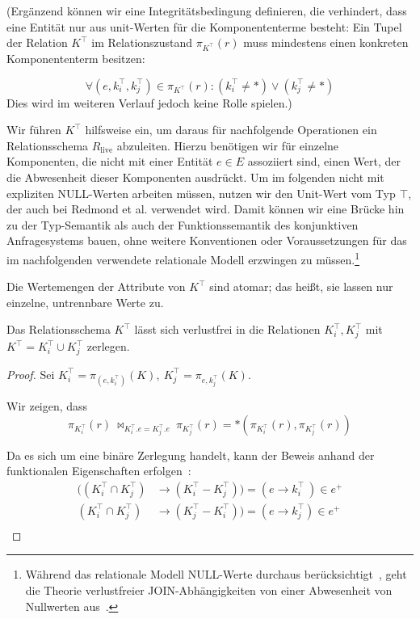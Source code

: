 \noindent
(Ergänzend können wir eine Integritätsbedingung definieren, die verhindert, dass eine Entität nur aus unit-Werten für die Komponententerme besteht: Ein Tupel der Relation $K^\top$ im Relationszustand $\pi_{K^\top}(r)$ muss mindestens einen konkreten Komponententerm besitzen:

\[
  \forall (e, k^\top_i, k^\top_j) \in \pi_{K^\top}(r): (k^\top_i \neq *) \lor (k^\top_j \neq *)
\]
\noindent
Dies wird im weiteren Verlauf jedoch keine Rolle spielen.)

\bigskip
\noindent
Wir führen $K^\top$ hilfsweise ein, um daraus für nachfolgende Operationen ein Relationsschema $R_\text{live}$ abzuleiten.
Hierzu benötigen wir für einzelne Komponenten, die nicht mit einer Entität $e \in E$ assoziiert sind, einen Wert, der die Abwesenheit dieser Komponenten ausdrückt.
Um im folgenden nicht mit expliziten NULL-Werten arbeiten müssen, nutzen wir den Unit-Wert vom Typ $\top$, der auch bei Redmond et al. verwendet wird.
Damit können wir eine Brücke hin zu der Typ-Semantik als auch der Funktionssemantik des konjunktiven Anfragesystems bauen, ohne weitere Konventionen oder Voraussetzungen für das im nachfolgenden verwendete relationale Modell erzwingen zu müssen.\footnote{Während das relationale Modell NULL-Werte durchaus berücksichtigt~\cite[136]{EN11}, geht die Theorie verlustfreier JOIN-Abhängigkeiten von einer Abwesenheit von Nullwerten aus~\cite[S. 347--348]{EN11}.
}

\bigskip
\begin{axiom}\label{ax:nur_atomar}
Die Wertemengen der Attribute von $K^\top$ sind atomar; das heißt, sie lassen nur einzelne, untrennbare Werte zu.
\end{axiom}

\bigskip
\begin{theorem}\label{th:K_ist_verlustfrei}
    Das Relationsschema $K^\top$ lässt sich verlustfrei in die Relationen $K^\top_i, K^\top_j$ mit $K^\top = K^\top_i \cup K^\top_j$ zerlegen.
\end{theorem}

\medskip
\begin{proof}
    Sei $K^{\top}_i = \pi_{(e, k^{\top}_i)}(K),\ K^{\top}_j = \pi_{e, k^{\top}_j}(K)$.

    \noindent
    Wir zeigen, dass
    \[
        \pi_{K^{\top}_i}(r)\ \bowtie_{K^{\top}_i.e = K^{\top}_j.e}\ \pi_{K^{\top}_j}(r) = *(\pi_{K^{\top}_i}(r), \pi_{K^{\top}_j}(r))
    \]

    \bigskip
    \noindent
    Da es sich um eine binäre Zerlegung handelt, kann der Beweis anhand der funktionalen Eigenschaften erfolgen~\cite[S. 343]{EN11}:
    \[
        \begin{alignedat}{3}
        ((K^{\top}_i \cap K^{\top}_j) &\rightarrow (K^{\top}_i - K^{\top}_j)) = (e \rightarrow k^{\top}_i\ ) \in e^+\\
        (K^{\top}_i \cap K^{\top}_j) &\rightarrow (K^{\top}_j - K^{\top}_i)) = (e \rightarrow k^{\top}_j) \in e^+\\
        \end{alignedat}
    \]
\end{proof}


